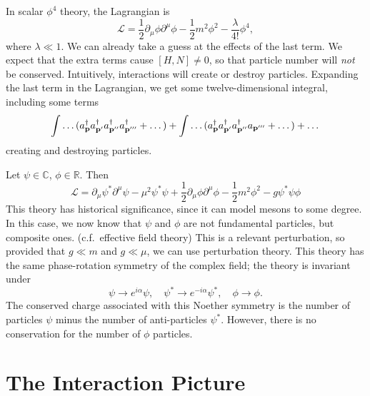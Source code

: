 \begin{example}
  In scalar $\phi^4$ theory, the Lagrangian is
  \begin{equation}
    \mathcal{L} = \frac{1}{2} \partial_\mu \phi \partial^\mu \phi - \frac{1}{2} m^2 \phi^2 - \frac{\lambda}{4!} \phi^4,
  \end{equation}
  where $\lambda \ll 1$.
  We can already take a guess at the effects of the last term. We expect that the extra terms cause $[H, N] \neq 0$, so that particle number will \emph{not} be conserved.
  Intuitively, interactions will create or destroy particles.
  Expanding the last term in the Lagrangian, we get some twelve-dimensional integral, including some terms
  \begin{equation}
    \int \dots (a_{\vb{p}}^{\dagger} a_{\vb{p}'}^{\dagger} a_{\vb{p}''}^{\dagger} a_{\vb{p}'''}^{\dagger} + \dots)
    + \int \dots (a_{\vb{p}}^{\dagger} a_{\vb{p}'}^{\dagger} a_{\vb{p}''}^{\dagger} a_{\vb{p}'''} + \dots ) + \dots
  \end{equation}
  creating and destroying particles.
\end{example}

\begin{example}
  Let $\psi \in \mathbb{C}$, $\phi \in \mathbb{R}$. Then 
  \begin{equation}
    \mathcal{L} = \partial_\mu \psi^* \partial^\mu \psi - \mu^2 \psi^* \psi + \frac{1}{2} \partial_\mu \phi \partial^\mu \phi - \frac{1}{2}m^2 \phi^2 - g \psi^* \psi \phi
  \end{equation}
  This theory has historical significance, since it can model mesons to some degree.
  In this case, we now know that $\psi$ and $\phi$ are not fundamental particles, but composite ones. (c.f.~effective field theory)
  This is a relevant perturbation, so provided that $g \ll m$ and $ g \ll \mu$, we can use perturbation theory.
  This theory has the same phase-rotation symmetry of the complex field; the theory is invariant under
  \begin{equation}
  \psi \to e^{i \alpha} \psi, \quad \psi^* \to e^{-i \alpha} \psi^*, \quad \phi \to \phi.
  \end{equation}
  The conserved charge associated with this Noether symmetry is the number of particles $\psi$ minus the number of anti-particles $\psi^*$.
  However, there is no conservation for the number of $\phi$ particles.
\end{example}

\section{The Interaction Picture}%
\label{sec:the_interaction_picture}

